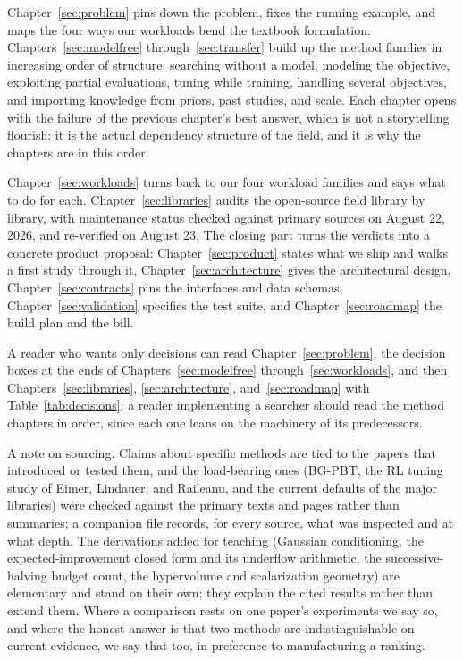 Chapter~\ref{sec:problem} pins down the problem, fixes the running
example, and maps the four ways our workloads bend the textbook
formulation. Chapters~\ref{sec:modelfree} through~\ref{sec:transfer}
build up the method families in increasing order of structure: searching
without a model, modeling the objective, exploiting partial evaluations,
tuning while training, handling several objectives, and importing
knowledge from priors, past studies, and scale. Each chapter opens with
the failure of the previous chapter's best answer, which is not a
storytelling flourish: it is the actual dependency structure of the
field, and it is why the chapters are in this order.

Chapter~\ref{sec:workloads} turns back to our four workload families and
says what to do for each. Chapter~\ref{sec:libraries} audits the
open-source field library by library, with maintenance status checked
against primary sources on August 22, 2026, and re-verified on
August 23. The closing part turns the verdicts into a concrete product
proposal: Chapter~\ref{sec:product} states what we ship and walks a
first study through it, Chapter~\ref{sec:architecture} gives the
architectural design, Chapter~\ref{sec:contracts} pins the interfaces
and data schemas, Chapter~\ref{sec:validation} specifies the test
suite, and Chapter~\ref{sec:roadmap} the build plan and the bill.

A reader who wants
only decisions can read Chapter~\ref{sec:problem}, the decision boxes
at the ends of Chapters~\ref{sec:modelfree}
through~\ref{sec:workloads}, and then Chapters~\ref{sec:libraries},
\ref{sec:architecture}, and~\ref{sec:roadmap} with
Table~\ref{tab:decisions}; a reader implementing a searcher should
read the method chapters in order, since each one leans on the
machinery of its predecessors.

A note on sourcing. Claims about specific methods are tied to the papers
that introduced or tested them, and the load-bearing ones (BG-PBT, the
RL tuning study of Eimer, Lindauer, and Raileanu, and the current
defaults of the major libraries) were checked against the primary texts
and pages rather than summaries; a companion file records, for every
source, what was inspected and at what depth. The derivations added for
teaching (Gaussian conditioning, the expected-improvement closed form
and its underflow arithmetic, the successive-halving budget count, the
hypervolume and scalarization geometry) are elementary and stand on
their own; they explain the cited results rather than extend them.
Where a comparison rests on one paper's experiments we say so, and
where the honest answer is that two methods are indistinguishable on
current evidence, we say that too, in preference to manufacturing a
ranking.
